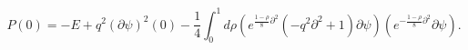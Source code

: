 \begin{equation}
\label{p0-se} P(0)=-E+q^2 (\partial \psi)^2(0)-\frac14 \int_0^1
d\rho\left( e^{\frac{1-\rho}{8}{\partial}^2}(
-q^2{\partial}^2+1)\partial\psi\right)
  \left( e^{-\frac{1-\rho}{8}{\partial}^2}\partial  \psi \right).
\end{equation}

